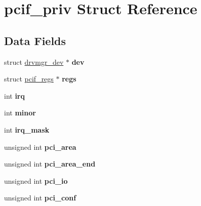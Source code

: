 \hypertarget{structpcif__priv}{}\section{pcif\+\_\+priv Struct Reference}
\label{structpcif__priv}
\subsection*{Data Fields}
\begin{DoxyCompactItemize}
\item 
\mbox{\label{structpcif__priv_a4cc1e2992dfd4d0c819b987ff3546cc4}} 
struct \mbox{\hyperlink{structdrvmgr__dev}{drvmgr\+\_\+dev}} $\ast$ {\bfseries dev}
\item 
\mbox{\label{structpcif__priv_ab163d701a88f5921c07b30a7ddcda216}} 
struct \mbox{\hyperlink{structpcif__regs}{pcif\+\_\+regs}} $\ast$ {\bfseries regs}
\item 
\mbox{\label{structpcif__priv_a541039e47ad8b31e5756ab9d0ccb9063}} 
int {\bfseries irq}
\item 
\mbox{\label{structpcif__priv_a854663ccf1102a8efef807b5471d44b1}} 
int {\bfseries minor}
\item 
\mbox{\label{structpcif__priv_add2ca4909f286ba8816dd4d31ff767cb}} 
int {\bfseries irq\+\_\+mask}
\item 
\mbox{\label{structpcif__priv_aee9ab8d0d9eedf0acbb6791194cf9349}} 
unsigned int {\bfseries pci\+\_\+area}
\item 
\mbox{\label{structpcif__priv_aacbab40fb1a967b602a552083ed58e44}} 
unsigned int {\bfseries pci\+\_\+area\+\_\+end}
\item 
\mbox{\label{structpcif__priv_af211c9c96c5a0e2a662a4d6ef80c3e3f}} 
unsigned int {\bfseries pci\+\_\+io}
\item 
\mbox{\label{structpcif__priv_a16e70ade30e7a82af5977c8aaa2d188f}} 
unsigned int {\bfseries pci\+\_\+conf}
\item 
\mbox{\label{structpcif__priv_a8a9f252402c8f62a14786b542fd4532c}} 

\end{DoxyCompactItemize}

